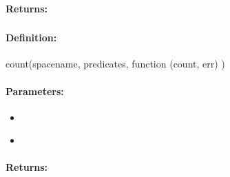 \paragraph{Returns:}


\pagebreak
\subsubsection{}
\label{api:nodejs:count}


\paragraph{Definition:}
\begin{javascriptcode}
count(spacename, predicates, function (count, err) {})
\end{javascriptcode}
\paragraph{Parameters:}
\begin{itemize}[noitemsep]
\item {}\\

\item {}\\

\end{itemize}

\paragraph{Returns:}


